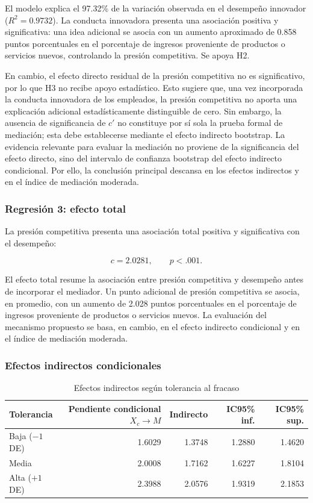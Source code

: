 \documentclass[12pt,letterpaper]{article}
\begin{document}
El modelo explica el 97.32\% de la variación observada en el desempeño innovador ($R^2=0.9732$). La conducta innovadora presenta una asociación positiva y significativa: una idea adicional se asocia con un aumento aproximado de 0.858 puntos porcentuales en el porcentaje de ingresos proveniente de productos o servicios nuevos, controlando la presión competitiva. Se apoya H2.

En cambio, el efecto directo residual de la presión competitiva no es significativo, por lo que H3 no recibe apoyo estadístico. Esto sugiere que, una vez incorporada la conducta innovadora de los empleados, la presión competitiva no aporta una explicación adicional estadísticamente distinguible de cero. Sin embargo, la ausencia de significancia de $c'$ no constituye por sí sola la prueba formal de mediación; esta debe establecerse mediante el efecto indirecto bootstrap. La evidencia relevante para evaluar la mediación no proviene de la significancia del efecto directo, sino del intervalo de confianza bootstrap del efecto indirecto condicional. Por ello, la conclusión principal descansa en los efectos indirectos y en el índice de mediación moderada.

\subsubsection{Regresión 3: efecto total}

La presión competitiva presenta una asociación total positiva y significativa con el desempeño:

\[
c=2.0281,\qquad p<.001.
\]

El efecto total resume la asociación entre presión competitiva y desempeño antes de incorporar el mediador. Un punto adicional de presión competitiva se asocia, en promedio, con un aumento de 2.028 puntos porcentuales en el porcentaje de ingresos proveniente de productos o servicios nuevos. La evaluación del mecanismo propuesto se basa, en cambio, en el efecto indirecto condicional y en el índice de mediación moderada.

\subsubsection{Efectos indirectos condicionales}

\begin{table}[H]
\centering
\caption{Efectos indirectos según tolerancia al fracaso}
\begin{tabular}{lrrrr}
\toprule
Tolerancia & Pendiente condicional $X_c\rightarrow M$ & Indirecto & IC95\% inf. & IC95\% sup. \\
\midrule
Baja ($-1$ DE) & 1.6029 & 1.3748 & 1.2880 & 1.4620 \\
Media & 2.0008 & 1.7162 & 1.6227 & 1.8104 \\
Alta ($+1$ DE) & 2.3988 & 2.0576 & 1.9319 & 2.1853 \\
\bottomrule
\end{tabular}
\end{table}
\end{document}
